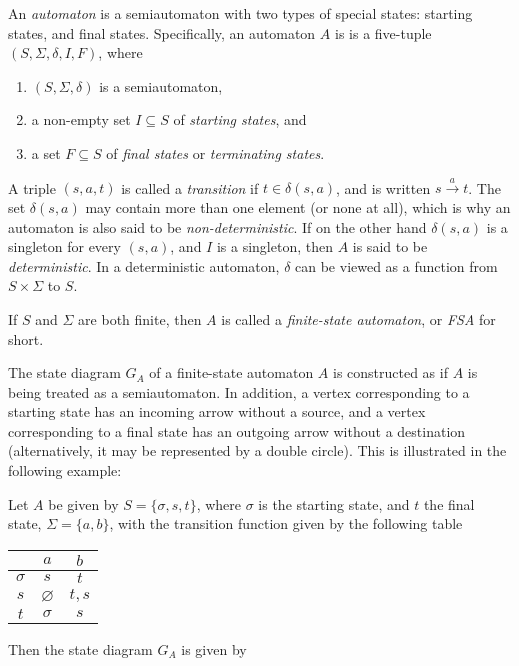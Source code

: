 \documentclass[12pt]{article}
\begin{document}
An \emph{automaton} is a semiautomaton with two types of special states: starting states, and final states.  Specifically, an automaton $A$ is is a five-tuple $(S,\Sigma,\delta,I,F)$, where
\begin{enumerate}
\item 
$(S,\Sigma,\delta)$ is a semiautomaton, 
\item
a non-empty set $I\subseteq S$ of \emph{starting states}, and
\item
a set $F\subseteq S$ of \emph{final states} or \emph{terminating states}.
\end{enumerate}

A triple $(s,a,t)$ is called a \emph{transition} if $t\in \delta(s,a)$, and is written $s\stackrel{a}{\longrightarrow} t$.  The set $\delta(s,a)$ may contain more than one element (or none at all), which is why an automaton is also said to be \emph{non-deterministic}.  If on the other hand $\delta(s,a)$ is a singleton for every $(s,a)$, and $I$ is a singleton, then $A$ is said to be \emph{deterministic}.  In a deterministic automaton, $\delta$ can be viewed as a function from $S\times \Sigma$ to $S$.

If $S$ and $\Sigma$ are both finite, then $A$ is called a \emph{finite-state automaton}, or \emph{FSA} for short.

The state diagram $G_A$ of a finite-state automaton $A$ is constructed as if $A$ is being treated as a semiautomaton.  In addition, a vertex corresponding to a starting state has an incoming arrow without a source, and a vertex corresponding to a final state has an outgoing arrow without a destination (alternatively, it may be represented by a double circle).  This is illustrated in the following example: 

Let $A$ be given by $S=\lbrace \sigma, s, t\rbrace$, where $\sigma$ is the starting state, and $t$ the final state, $\Sigma=\lbrace a,b\rbrace$, with the transition function given by the following table
\begin{center}
\begin{tabular}{|c||c|c|}
\hline
& $a$ & $b$  \\
\hline\hline
$\sigma$ & $s$ & $t$ \\
\hline
$s$ & $\varnothing$ & $t,s$ \\
\hline
$t$ & $\sigma$ & $s$ \\
\hline
\end{tabular}
\end{center}

Then the state diagram $G_A$ is given by
\begin{figure}[!h]
\centering
{}
\end{figure}
\end{document}
